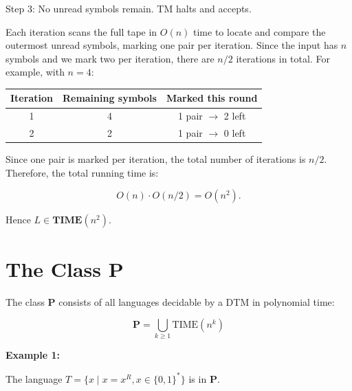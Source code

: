 \documentclass[12pt,a4paper,openany]{article}
\begin{document}
Step 3: No unread symbols remain. TM halts and accepts.

\begin{center}
\end{center}

Each iteration scans the full tape in $O(n)$ time to locate and compare the outermost 
unread symbols, marking one pair per iteration. Since the input has $n$ symbols and 
we mark two per iteration, there are $n/2$ iterations in total. For example, with $n = 4$:

\begin{table}[h]
\centering
\begin{tabular}{|c|c|c|}
\hline
\textbf{Iteration} & \textbf{Remaining symbols} & \textbf{Marked this round} \\
\hline
1 & 4 & 1 pair $\to$ 2 left \\
2 & 2 & 1 pair $\to$ 0 left \\
\hline
\end{tabular}
\end{table}

Since one pair is marked per iteration, the total number of iterations is $n/2$.
Therefore, the total running time is:

\[
O(n) \cdot O(n/2) = O(n^2).
\]

Hence $L \in \mathbf{TIME}(n^2)$.

\section{The Class P}

The class $\mathbf{P}$ consists of all languages decidable by a DTM in polynomial time:

\[\mathbf{P} = \bigcup_{k \geq 1} \text{TIME}(n^k)\]

\textbf{Example 1:}

The language $T = \{ x  \mid x = x^R,  x \in \{0,1\}^*  \}$ is in $\mathbf{P}$.
\end{document}

